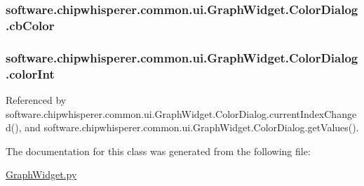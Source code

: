 \subsubsection[{cb\+Color}]{\setlength{\rightskip}{0pt plus 5cm}software.\+chipwhisperer.\+common.\+ui.\+Graph\+Widget.\+Color\+Dialog.\+cb\+Color}\label{classsoftware_1_1chipwhisperer_1_1common_1_1ui_1_1GraphWidget_1_1ColorDialog_a98e4aea598edf40302ef87c432a02b16}
\hypertarget{classsoftware_1_1chipwhisperer_1_1common_1_1ui_1_1GraphWidget_1_1ColorDialog_acaecfb6a19402664b7020f129377b3e8}{}
\subsubsection[{color\+Int}]{\setlength{\rightskip}{0pt plus 5cm}software.\+chipwhisperer.\+common.\+ui.\+Graph\+Widget.\+Color\+Dialog.\+color\+Int}\label{classsoftware_1_1chipwhisperer_1_1common_1_1ui_1_1GraphWidget_1_1ColorDialog_acaecfb6a19402664b7020f129377b3e8}


Referenced by software.\+chipwhisperer.\+common.\+ui.\+Graph\+Widget.\+Color\+Dialog.\+current\+Index\+Changed(), and software.\+chipwhisperer.\+common.\+ui.\+Graph\+Widget.\+Color\+Dialog.\+get\+Values().



The documentation for this class was generated from the following file\+:\begin{DoxyCompactItemize}
\item 
\hyperlink{GraphWidget_8py}{Graph\+Widget.\+py}\end{DoxyCompactItemize}
